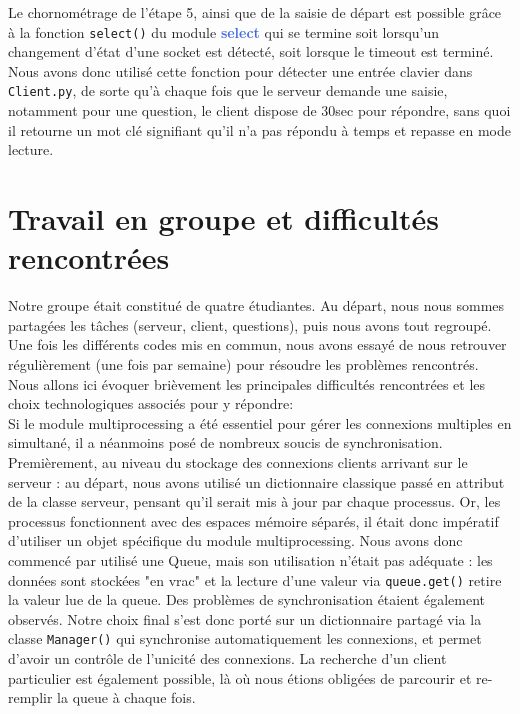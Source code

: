 \documentclass[12pt, a4paper]{article}
\begin{document}
Le chornométrage de l'étape 5, ainsi que de la saisie de départ est possible grâce à la fonction \texttt{select()} du module \textbf{\textcolor{RoyalBlue}{select}} qui se termine soit lorsqu'un changement d'état d'une socket est détecté, soit lorsque le timeout est terminé. Nous avons donc utilisé cette fonction pour détecter une entrée clavier dans \texttt{Client.py}, de sorte qu'à chaque fois que le serveur demande une saisie, notamment pour une question, le client dispose de 30sec pour répondre, sans quoi il retourne un mot clé signifiant qu'il n'a pas répondu à temps et repasse en mode lecture.

\section{Travail en groupe et difficultés rencontrées}
Notre groupe était constitué de quatre étudiantes. Au départ, nous nous sommes partagées les tâches (serveur, client, questions), puis nous avons tout regroupé. Une fois les différents codes mis en commun, nous avons essayé de nous retrouver régulièrement (une fois par semaine) pour résoudre les problèmes rencontrés. Nous allons ici évoquer brièvement les principales difficultés rencontrées et les choix technologiques associés pour y répondre:\\

Si le module multiprocessing a été essentiel pour gérer les connexions multiples en simultané, il a néanmoins posé de nombreux soucis de synchronisation. Premièrement, au niveau du stockage des connexions clients arrivant sur le serveur : au départ, nous avons utilisé un dictionnaire classique passé en attribut de la classe serveur, pensant qu'il serait mis à jour par chaque processus. Or, les processus fonctionnent avec des espaces mémoire séparés, il était donc impératif d'utiliser un objet spécifique du module multiprocessing. Nous avons donc commencé par utilisé une Queue, mais son utilisation n'était pas adéquate : les données sont stockées "en vrac" et la lecture d'une valeur via \texttt{queue.get()} retire la valeur lue de la queue. Des problèmes de synchronisation étaient également observés. Notre choix final s'est donc porté sur un dictionnaire partagé via la classe \texttt{Manager()} qui synchronise automatiquement les connexions, et permet d'avoir un contrôle de l'unicité des connexions. La recherche d'un client particulier est également possible, là où nous étions obligées de parcourir et re-remplir la queue à chaque fois.\\
    
\end{document}
